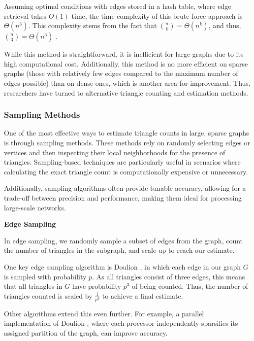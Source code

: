 \documentclass[11pt]{article}
\newcommand{\subsubsubsection}[1]{
  \vspace{1em} %
  \noindent\textbf{#1} %
  \vspace{0.5em} %
}
\begin{document}
Assuming optimal conditions with edges stored in a hash table, where edge retrieval takes $O(1)$ time, the time complexity of this brute force approach is $\Theta(n^3)$. 
This complexity stems from the fact that ${n \choose k} = \Theta(n^k)$, and thus, ${n \choose 3} = \Theta(n^3)$ \cite{al_hasan_triangle_2018}. 

While this method is straightforward, it is inefficient for large graphs due to its high computational cost.
Additionally, this method is no more efficient on sparse graphs (those with relatively few edges compared to the maximum number of edges possible) than on dense ones, which is another area for improvement.
Thus, researchers have turned to alternative triangle counting and estimation methods.

\subsubsection{Sampling Methods}

One of the most effective ways to estimate triangle counts in large, sparse graphs is through sampling methods.
These methods rely on randomly selecting edges or vertices and then inspecting their local neighborhoods for the presence of triangles.
Sampling-based techniques are particularly useful in scenarios where calculating the exact triangle count is computationally expensive or unnecessary.

Additionally, sampling algorithms often provide tunable accuracy, allowing for a trade-off between precision and performance, making them ideal for processing large-scale networks.

\subsubsubsection{Edge Sampling}

In edge sampling, we randomly sample a subset of edges from the graph, count the number of triangles in the subgraph, and scale up to reach our estimate.

One key edge sampling algorithm is Doulion \cite{tsourakakis_doulion_2009}, in which each edge in our graph $G$ is sampled with probability $p$.
As all triangles consist of three edges, this means that all triangles in $G$ have probability $p^3$ of being counted.
Thus, the number of triangles counted is scaled by $\frac{1}{p^3}$ to achieve a final estimate.

Other algorithms extend this even further.
For example, a parallel implementation of Doulion \cite{arifuzzaman_parallel_2012}, where each processor independently sparsifies its assigned partition of the graph, can improve accuracy.
\end{document}
